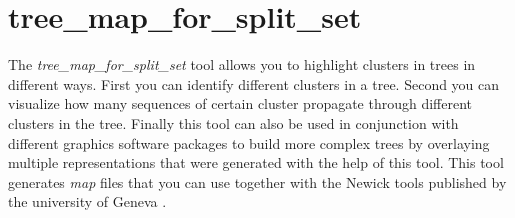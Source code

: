 \section{tree\_map\_for\_split\_set} \label{sec-treemapss}

The \emph{tree\_map\_for\_split\_set} tool allows you to highlight
clusters in trees in different ways. First you can identify different
clusters in a tree. Second you can visualize how many sequences of
certain cluster propagate through different clusters in the tree.
Finally this tool can also
be used in conjunction with different graphics software packages to build more
complex trees by overlaying multiple representations that were generated with
the help of this tool. This tool generates \emph{map} files that you
can use together with the Newick tools published by the university of
Geneva \cite{newick_tools}.

